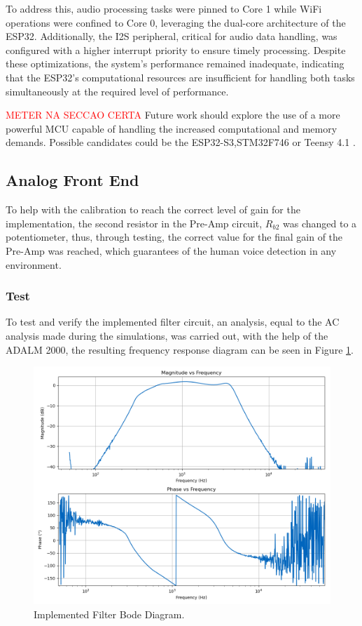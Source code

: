 To address this, audio processing tasks were pinned to Core 1 while WiFi operations were confined to Core 0, leveraging the dual-core architecture of the ESP32. Additionally, the I2S peripheral, critical for audio data handling, was configured with a higher interrupt priority to ensure timely processing. Despite these optimizations, the system's performance remained inadequate, indicating that the ESP32's computational resources are insufficient for handling both tasks simultaneously at the required level of performance.

\textcolor{red}{METER NA SECCAO CERTA}
Future work should explore the use of a more powerful MCU capable of handling the increased computational and memory demands. Possible candidates could be the ESP32-S3,STM32F746 or Teensy 4.1 .

\subsection{Analog Front End}

To help with the calibration to reach the correct level of gain for the implementation, the second resistor in the Pre-Amp circuit, $R_{b2}$ was changed to a potentiometer, thus, through testing, the correct value for the final gain of the Pre-Amp was reached, which guarantees of the human voice detection in any environment.

\subsubsection{Test}

To test and verify the implemented filter circuit, an analysis, equal to the AC analysis made during the simulations, was carried out, with the help of the ADALM 2000, the resulting frequency response diagram can be seen in Figure \ref{fig:AnalogFilterBodeScoppy}.

\begin{figure}[H]
    \centering
    \includegraphics*[scale = 0.5]{Images/AnalogFilterScoppyBode.png}
    \caption{Implemented Filter Bode Diagram.}
    \label{fig:AnalogFilterBodeScoppy}
\end{figure}

